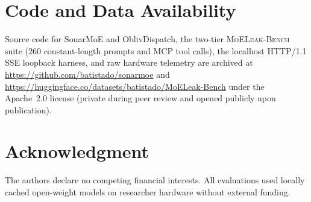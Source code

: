 \documentclass[10pt,journal,compsoc]{IEEEtran}
\def\SM{SonarMoE}%
\def\OD{OblivDispatch}%
\theoremstyle{definition}
\theoremstyle{remark}
\newcommand{\SM}{\textsc{SonarMoE}}
\newcommand{\OD}{\textsc{OblivDispatch}}
\newcommand{\MLB}{\textsc{MoELeak-Bench}}
\begin{document}
\section*{Code and Data Availability}
Source code for \SM{} and \OD{}, the two-tier \MLB{} suite ($260$ constant-length prompts and MCP tool calls), the localhost HTTP/1.1 SSE loopback harness, and raw hardware telemetry are archived at \url{https://github.com/batistado/sonarmoe} and \url{https://huggingface.co/datasets/batistado/MoELeak-Bench} under the Apache~2.0 license (private during peer review and opened publicly upon publication).

\section*{Acknowledgment}
The authors declare no competing financial interests. All evaluations used locally cached open-weight models on researcher hardware without external funding.


\let\oldthebibliography\thebibliography
\renewcommand\thebibliography[1]{\oldthebibliography{#1}\setlength{\itemsep}{0pt}\setlength{\parskip}{0pt}}

\end{document}
